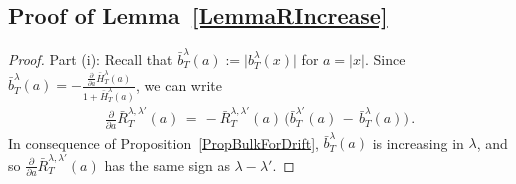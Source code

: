 \documentclass[10pt]{article}
\numberwithin{equation}{section}
\theoremstyle{definition}
\begin{document}
\subsection{Proof of Lemma~\ref{LemmaRIncrease}} \label{SubsectionLemmaRIncrease}

\begin{proof} Part (i): Recall that $\bar{b}_{T}^{\lambda}(a):=\big| b_T^{\lambda}(x)  \big|$ for $a=|x|$. Since $\bar{b}_T^{\lambda}(a)=-\frac{ \frac{\partial}{\partial a} \bar{H}_{T}^{\lambda}( a) }{1+\bar{H}_{T}^{\lambda}( a)  }$, we can write
\begin{align*}
   \frac{\partial}{\partial a} \bar{R}^{\lambda,\lambda'}_{T}(a) \,=\,- \bar{R}^{\lambda,\lambda'}_{T}(a)\,\Big(\bar{b}_T^{\lambda'}(a)\,-\, \bar{b}_T^{\lambda}(a) \Big)\,.
\end{align*}
In consequence of Proposition~\ref{PropBulkForDrift},  $\bar{b}_T^{\lambda}(a)$ is increasing in $\lambda$, and so $\frac{\partial}{\partial a} \bar{R}^{\lambda,\lambda'}_{T}(a)$ has the same sign as $\lambda-\lambda'$.\vspace{.2cm}




\end{proof}
\end{document}
